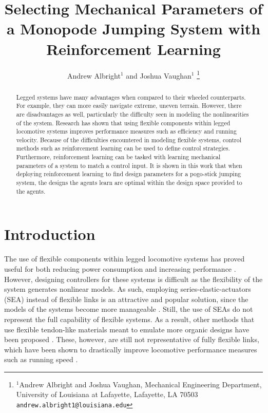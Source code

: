 \documentclass[letterpaper, 10 pt, conference]{ieeeconf}  %
\title{\LARGE \bf
Selecting Mechanical Parameters of a Monopode Jumping System with Reinforcement Learning
}
\author{Andrew Albright$^{1}$ and Joshua Vaughan$^{1}$%
\thanks{$^{1}$Andrew Albright and Joshua Vaughan, Mechanical Engineering Department, University of Louisiana at Lafayette, Lafayette, LA 70503
        {\tt\small andrew.albright1@louisiana.edu}}%
}
\begin{document}
\maketitle
\thispagestyle{empty}
\pagestyle{empty}


\begin{abstract}

Legged systems have many advantages when compared to their wheeled counterparts. For example, they can more easily navigate extreme, uneven terrain. However, there are disadvantages as well, particularly the difficulty seen in modeling the nonlinearities of the system. Research has shown that using flexible components within legged locomotive systems improves performance measures such as efficiency and running velocity. Because of the difficulties encountered in modeling flexible systems, control methods such as reinforcement learning can be used to define control strategies. Furthermore, reinforcement learning can be tasked with learning mechanical parameters of a system to match a control input. It is shown in this work that when deploying reinforcement learning to find design parameters for a pogo-stick jumping system, the designs the agents learn are optimal within the design space provided to the agents.

\end{abstract}


\section{Introduction}
\label{sec:intro}
The use of flexible components within legged locomotive systems has proved useful for both reducing power consumption and increasing performance \cite{Sugiyama2004, Buondonno2017, Hurst2008}. However, designing controllers for these systems is difficult as the flexibility of the system generates nonlinear models. As such, employing series-elastic-actuators (SEA) instead of flexible links is an attractive and popular solution, since the models of the systems become more manageable \cite{Buondonno2017, Zhang2019, Pratt1995}. Still, the use of SEAs do not represent the full capability of flexible systems. As a result, other methods that use flexible tendon-like materials meant to emulate more organic designs have been proposed \cite{Iida2005}. These, however, are still not representative of fully flexible links, which have been shown to drastically improve locomotive performance measures such as running speed \cite{Saranli2001}.
\end{document}
